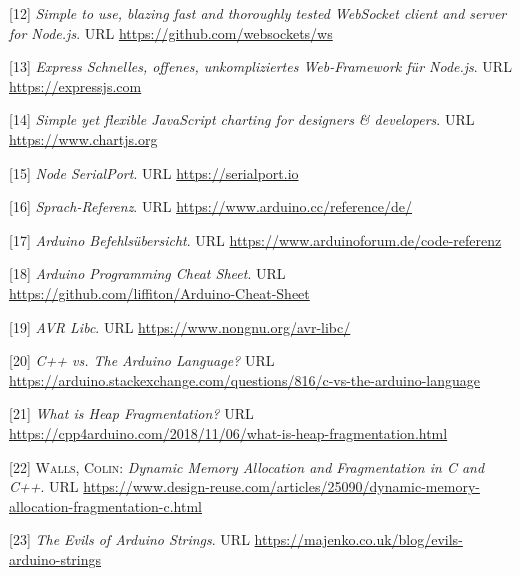 \documentclass[
  ngerman,
  a4paper,
  12pt]{scrartcl}
\newlength{\cslhangindent}
\newenvironment{cslreferences}%
  {\setlength{\parindent}{0pt}%
  \everypar{\setlength{\hangindent}{\cslhangindent}}\ignorespaces}%
  {\par}
\begin{document}
\begin{cslreferences}
\leavevmode\hypertarget{ref-websockets}{}%
{[}12{]} \emph{Simple to use, blazing fast and thoroughly tested
WebSocket client and server for Node.js}. URL
\url{https://github.com/websockets/ws}

\leavevmode\hypertarget{ref-express}{}%
{[}13{]} \emph{Express Schnelles, offenes, unkompliziertes Web-Framework
für Node.js}. URL \url{https://expressjs.com}

\leavevmode\hypertarget{ref-chartjs}{}%
{[}14{]} \emph{Simple yet flexible JavaScript charting for designers \&
developers}. URL \url{https://www.chartjs.org}

\leavevmode\hypertarget{ref-serialPort}{}%
{[}15{]} \emph{Node SerialPort}. URL \url{https://serialport.io}

\leavevmode\hypertarget{ref-sprachreferenz}{}%
{[}16{]} \emph{Sprach-Referenz}. URL
\url{https://www.arduino.cc/reference/de/}

\leavevmode\hypertarget{ref-codeReferenz}{}%
{[}17{]} \emph{Arduino Befehlsübersicht}. URL
\url{https://www.arduinoforum.de/code-referenz}

\leavevmode\hypertarget{ref-arduinoCheatSheet}{}%
{[}18{]} \emph{Arduino Programming Cheat Sheet}. URL
\url{https://github.com/liffiton/Arduino-Cheat-Sheet}

\leavevmode\hypertarget{ref-avrlibc}{}%
{[}19{]} \emph{AVR Libc}. URL \url{https://www.nongnu.org/avr-libc/}

\leavevmode\hypertarget{ref-arduinoLanguage}{}%
{[}20{]} \emph{C++ vs. The Arduino Language?} URL
\url{https://arduino.stackexchange.com/questions/816/c-vs-the-arduino-language}

\leavevmode\hypertarget{ref-heapFragmentation}{}%
{[}21{]} \emph{What is Heap Fragmentation?} URL
\url{https://cpp4arduino.com/2018/11/06/what-is-heap-fragmentation.html}

\leavevmode\hypertarget{ref-heapFragmentation2}{}%
{[}22{]} \textsc{Walls, Colin}: \emph{Dynamic Memory Allocation and
Fragmentation in C and C++}. URL
\url{https://www.design-reuse.com/articles/25090/dynamic-memory-allocation-fragmentation-c.html}

\leavevmode\hypertarget{ref-arduinoStrings}{}%
{[}23{]} \emph{The Evils of Arduino Strings}. URL
\url{https://majenko.co.uk/blog/evils-arduino-strings}
\end{cslreferences}
\end{document}
